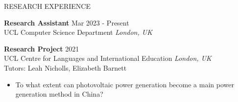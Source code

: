\documentclass{resume} %
\begin{document}
\begin{rSection}{RESEARCH EXPERIENCE}

\textbf{Research Assistant} \hfill Mar 2023 - Present\\
UCL Computer Science Department \hfill \textit{London, UK}

\textbf{Research Project} \hfill 2021\\
UCL Centre for Languages and International Education \hfill \textit{London, UK}\\
Tutors: Leah Nicholls, Elizabeth Barnett
\begin{itemize}
    \itemsep -3pt {} 
    \item To what extent can photovoltaic power generation become a main power generation method in China?
\end{itemize}

\end{rSection}
\end{document}
